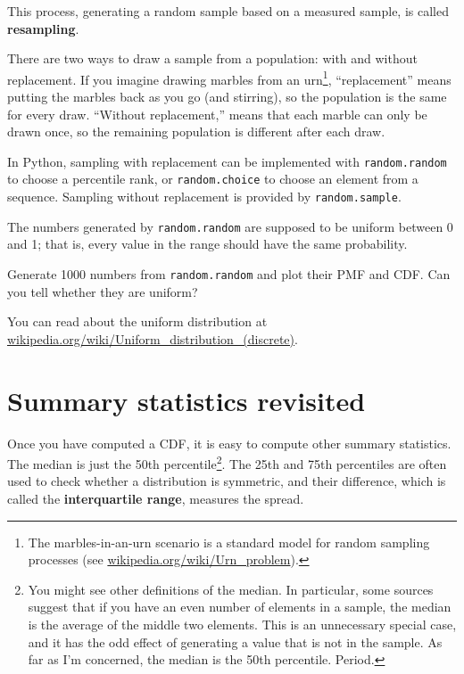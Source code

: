 \documentclass[12pt]{book}
\begin{document}
This process, generating a random sample based on a measured sample,
is called {\bf resampling}.


There are two ways to draw a sample from a population: with and
without replacement.  If you imagine drawing marbles from an
urn\footnote{The marbles-in-an-urn scenario is a standard model for
  random sampling processes (see
  \url{wikipedia.org/wiki/Urn_problem}).}, ``replacement'' means
putting the marbles back as you go (and stirring), so the population
is the same for every draw.  ``Without replacement,'' means that each
marble can only be drawn once, so the remaining population is
different after each draw.

In Python, sampling with replacement can be implemented with
{\tt random.random} to choose a percentile rank, or {\tt random.choice}
to choose an element from a sequence.  Sampling without replacement
is provided by {\tt random.sample}.


\begin{exercise}
The numbers generated by {\tt random.random} are supposed to be
uniform between 0 and 1; that is, every value in the range
should have the same probability.

Generate 1000 numbers from {\tt random.random} and plot their
PMF and CDF.  Can you tell whether they are uniform?

You can read about the uniform distribution at
\url{wikipedia.org/wiki/Uniform_distribution_(discrete)}.


\end{exercise}


\section{Summary statistics revisited}

Once you have computed a CDF, it is easy to compute other summary
statistics.  The median is just the 50th percentile\footnote{You might
see other definitions of the median.  In particular,
some sources suggest that if you have an even number of elements in
a sample, the median is the average of the middle two elements.
This is an unnecessary special case, and it has the odd effect of
generating a value that is not in the sample.  As far
as I'm concerned, the median is the 50th percentile.  Period.}.
The 25th and 75th percentiles are often used to check whether
a distribution is symmetric, and their difference, which is called
the {\bf interquartile range}, measures the spread.
\end{document}

